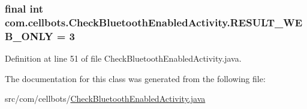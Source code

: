\hypertarget{classcom_1_1cellbots_1_1_check_bluetooth_enabled_activity_ae8c3d95959c9b97451b618f01d61e860}{
\subsubsection[{R\-E\-S\-U\-L\-T\-\_\-\-W\-E\-B\-\_\-\-O\-N\-L\-Y}]{\setlength{\rightskip}{0pt plus 5cm}final int {\bf com.\-cellbots.\-Check\-Bluetooth\-Enabled\-Activity.\-R\-E\-S\-U\-L\-T\-\_\-\-W\-E\-B\-\_\-\-O\-N\-L\-Y} = 3}}\label{classcom_1_1cellbots_1_1_check_bluetooth_enabled_activity_ae8c3d95959c9b97451b618f01d61e860}


Definition at line 51 of file Check\-Bluetooth\-Enabled\-Activity.\-java.



The documentation for this class was generated from the following file\-:\begin{DoxyCompactItemize}
\item 
src/com/cellbots/\hyperlink{_check_bluetooth_enabled_activity_8java}{Check\-Bluetooth\-Enabled\-Activity.\-java}\end{DoxyCompactItemize}
